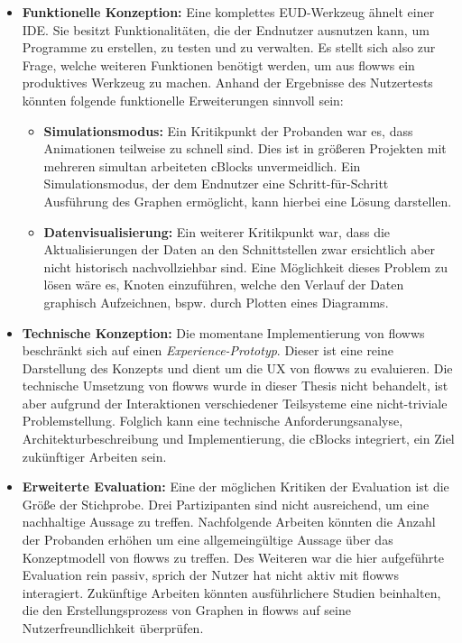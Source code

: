 \begin{itemize}
    \item \textbf{Funktionelle Konzeption:} Eine komplettes \ac{EUD}-Werkzeug ähnelt einer \ac{IDE}. Sie besitzt Funktionalitäten, die der Endnutzer ausnutzen kann, um Programme zu erstellen, zu testen und zu verwalten. Es stellt sich also zur Frage, welche weiteren Funktionen benötigt werden, um aus flowws ein produktives Werkzeug zu machen. Anhand der Ergebnisse des Nutzertests könnten folgende funktionelle Erweiterungen sinnvoll sein:
    \begin{itemize}
        \item \textbf{Simulationsmodus:} Ein Kritikpunkt der Probanden war es, dass Animationen teilweise zu schnell sind. Dies ist in größeren Projekten mit mehreren simultan arbeiteten \acp{cBlock} unvermeidlich. Ein Simulationsmodus, der dem Endnutzer eine Schritt-für-Schritt Ausführung des Graphen ermöglicht, kann hierbei eine Lösung darstellen.
        \item \textbf{Datenvisualisierung:} Ein weiterer Kritikpunkt war, dass die Aktualisierungen der Daten an den Schnittstellen zwar ersichtlich aber nicht historisch nachvollziehbar sind. Eine Möglichkeit dieses Problem zu lösen wäre es, Knoten einzuführen, welche den Verlauf der Daten graphisch Aufzeichnen, bspw. durch Plotten eines Diagramms.
    \end{itemize} 
    
    \item \textbf{Technische Konzeption:} Die momentane Implementierung von flowws beschränkt sich auf einen \textit{Experience-Prototyp}. Dieser ist eine reine Darstellung des Konzepts und dient um die \ac{UX} von flowws zu evaluieren. Die technische Umsetzung von flowws wurde in dieser Thesis nicht behandelt, ist aber aufgrund der Interaktionen verschiedener Teilsysteme eine nicht-triviale Problemstellung. Folglich kann eine technische Anforderungsanalyse, Architekturbeschreibung und Implementierung, die cBlocks integriert, ein Ziel zukünftiger Arbeiten sein. 
    
    \item \textbf{Erweiterte Evaluation:} Eine der möglichen Kritiken der Evaluation ist die Größe der Stichprobe. Drei Partizipanten sind nicht ausreichend, um eine nachhaltige Aussage zu treffen. Nachfolgende Arbeiten könnten die Anzahl der Probanden erhöhen um eine allgemeingültige Aussage über das Konzeptmodell von flowws zu treffen. Des Weiteren war die hier aufgeführte Evaluation rein passiv, sprich der Nutzer hat nicht aktiv mit flowws interagiert. Zukünftige Arbeiten könnten ausführlichere Studien beinhalten, die den Erstellungsprozess von Graphen in flowws auf seine Nutzerfreundlichkeit überprüfen.
\end{itemize}